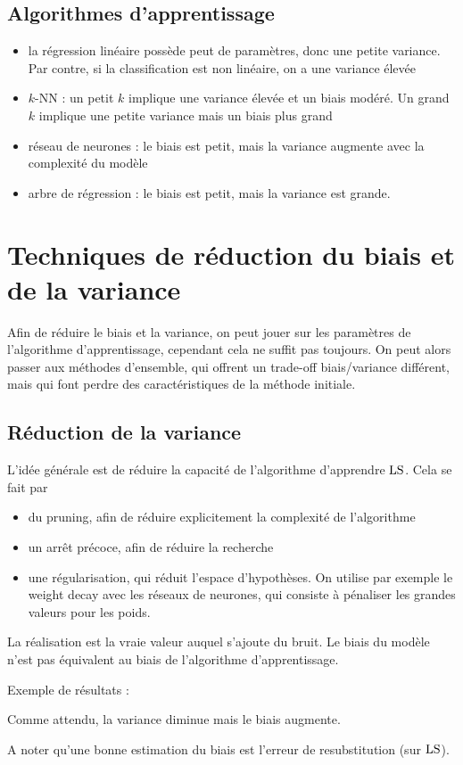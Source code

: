 		
		\subsection{Algorithmes d'apprentissage}
		
		
		
		\begin{itemize}
			\item la régression linéaire possède peut de paramètres, donc une petite variance. Par contre, si la classification est non linéaire, on a une variance élevée
			\item $k$-NN : un petit $k$ implique une variance élevée et un biais modéré. Un grand $k$ implique une petite variance mais un biais plus grand
			\item réseau de neurones : le biais est petit, mais la variance augmente avec la complexité du modèle
			\item arbre de régression : le biais est petit, mais la variance est grande.
		\end{itemize}
	\section{Techniques de réduction du biais et de la variance}
	
	Afin de réduire le biais et la variance, on peut jouer sur les paramètres de l'algorithme d'apprentissage, cependant cela ne suffit pas toujours. On peut alors passer aux méthodes d'ensemble, qui offrent un trade-off biais/variance différent, mais qui font perdre des caractéristiques de la méthode initiale.
	
		\subsection{Réduction de la variance}
		
		L'idée générale est de réduire la capacité de l'algorithme d'apprendre $\text{LS}$. Cela se fait par
		
		\begin{itemize}
			\item du pruning, afin de réduire explicitement la complexité de l'algorithme
			\item un arrêt précoce, afin de réduire la recherche
			\item une régularisation, qui réduit l'espace d'hypothèses. On utilise par exemple le weight decay avec les réseaux de neurones, qui consiste à pénaliser les grandes valeurs pour les poids.
		\end{itemize}
		
		
		La réalisation est la vraie valeur auquel s'ajoute du bruit. Le biais du modèle n'est pas équivalent au biais de l'algorithme d'apprentissage.
				
		Exemple de résultats :
		
		
		Comme attendu, la variance diminue mais le biais augmente.
		
		A noter qu'une bonne estimation du biais est l'erreur de resubstitution (sur $\text{LS}$).